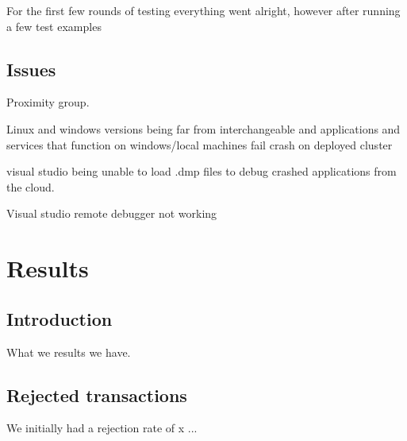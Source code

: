 \documentclass[a4paper,10pt,titlepage]{report}
\begin{document}
    For the first few rounds of testing everything went alright, however after running a few test examples

    \subsection{Issues}
    Proximity group.

    Linux and windows versions being far from interchangeable and applications and services that function on windows/local machines fail crash on deployed cluster

    visual studio being unable to load .dmp files to debug crashed applications from the cloud.

    Visual studio remote debugger not working
%
%
%
%
%
%
%
%
%

%


    \section{Results}

    \subsection{Introduction}

    What we results we have.

    \subsection{Rejected transactions}
    We initially had a rejection rate of x
    ...
\end{document}
